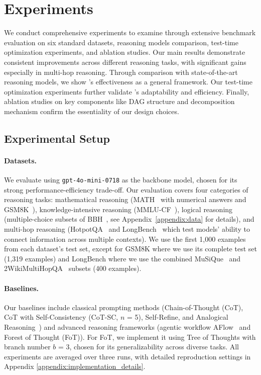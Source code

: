 \section{Experiments}
We conduct comprehensive experiments to examine \our through extensive benchmark evaluation on six standard datasets, reasoning models comparison, test-time optimization experiments, and ablation studies. Our main results demonstrate consistent improvements across different reasoning tasks, with significant gains especially in multi-hop reasoning. Through comparison with state-of-the-art reasoning models, we show \our's effectiveness as a general framework. Our test-time optimization experiments further validate \our's adaptability and efficiency. Finally, ablation studies on key components like DAG structure and decomposition mechanism confirm the essentiality of our design choices.

\subsection{Experimental Setup}
\paragraph{Datasets.}
We evaluate \our using {\texttt{gpt-4o-mini-0718}} as the backbone model, chosen for its strong performance-efficiency trade-off. Our evaluation covers four categories of reasoning tasks: mathematical reasoning (MATH~\cite{MATH2021} with numerical answers and GSM8K~\cite{gsm8k2021}), knowledge-intensive reasoning (MMLU-CF~\cite{MMLUCF2024}), logical reasoning (multiple-choice subsets of BBH~\cite{BBH2023}, see Appendix~\ref{appendix:data} for details), and multi-hop reasoning (HotpotQA~\cite{HotpotQA2018} and LongBench~\cite{longbench2024} which test models' ability to connect information across multiple contexts). We use the first 1,000 examples from each dataset's test set, except for GSM8K where we use its complete test set (1,319 examples) and LongBench where we use the combined MuSiQue~\cite{Musique2022} and 2WikiMultiHopQA~\cite{2WikiMultiHopQA} subsets (400 examples).

\paragraph{Baselines.}
Our baselines include classical prompting methods (Chain-of-Thought (CoT), CoT with Self-Consistency (CoT-SC, $n$ = 5), Self-Refine, and Analogical Reasoning~\cite{Yasunaga2024AP}) and advanced reasoning frameworks (agentic workflow AFlow~\cite{Zhang2024aflow} and Forest of Thought (FoT)). For FoT, we implement it using Tree of Thoughts with branch number $b$ = 3, chosen for its generalizability across diverse tasks. All experiments are averaged over three runs, with detailed reproduction settings in Appendix \ref{appendix:implementation_details}.

